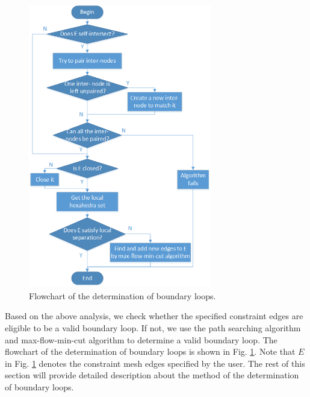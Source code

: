 \documentclass[final,5p,times,twocolumn]{elsarticle}
\begin{document}
\begin{figure}[htbp]
\begin{center}
\includegraphics[width=8cm]{flow_det_loop.png}
\caption{Flowchart of the determination of boundary loops.}
\label{fig:flow_det_loop}
\end{center}
\end{figure}

Based on the above analysis, we check whether the specified constraint edges are eligible to be a valid boundary loop. If not, we use the path searching algorithm and max-flow-min-cut algorithm to determine a valid boundary loop. The flowchart of the determination of boundary loops is shown in Fig. \ref{fig:flow_det_loop}. Note that $E$ in Fig. \ref{fig:flow_det_loop} denotes the constraint mesh edges specified by the user. The rest of this section will provide detailed description about the method of the determination of boundary loops.

\end{document}
